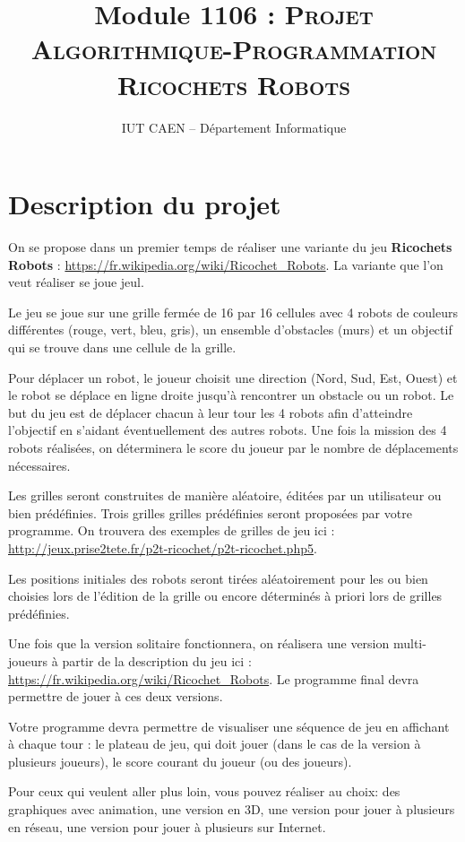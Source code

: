 \documentclass[10pt]{article}
\title{Module 1106 : \textsc{Projet Algorithmique-Programmation \\ Ricochets Robots}}
\author{IUT CAEN -- Département Informatique}
\begin{document}
\maketitle

\pagestyle{empty}

\section{Description du projet}

On se propose dans un premier temps de réaliser une variante du jeu {\bf Ricochets Robots} : \url{https://fr.wikipedia.org/wiki/Ricochet_Robots}. La variante que l'on veut réaliser se joue jeul.

Le jeu se joue sur une grille fermée de 16 par 16 cellules avec 4 robots de couleurs différentes (rouge, vert,
bleu, gris), un ensemble d'obstacles (murs) et un objectif qui se trouve dans une cellule de la grille.

Pour déplacer un robot, le joueur choisit une direction (Nord, Sud, Est, Ouest) et le robot
se déplace en ligne droite jusqu'à rencontrer un obstacle ou un robot. Le but du jeu
est de déplacer chacun à leur tour les 4 robots afin d'atteindre l'objectif en s'aidant éventuellement des autres robots. Une fois la mission des 4 robots réalisées, on déterminera le score du joueur par le nombre de déplacements nécessaires.

Les grilles seront construites de manière aléatoire, éditées par un utilisateur ou bien prédéfinies. 
Trois grilles grilles prédéfinies seront proposées par votre programme. On trouvera des exemples de grilles de jeu ici :
\url{http://jeux.prise2tete.fr/p2t-ricochet/p2t-ricochet.php5}.

Les positions initiales des robots seront tirées aléatoirement pour les ou bien choisies lors de l'édition de la grille ou encore déterminés à priori lors de grilles prédéfinies.

 Une fois que la version solitaire fonctionnera, on réalisera une version multi-joueurs à partir de la description du jeu ici :
\url{https://fr.wikipedia.org/wiki/Ricochet_Robots}. Le programme final devra permettre de jouer à ces deux versions.

Votre programme devra permettre de visualiser une séquence de jeu en affichant à chaque tour : le plateau de jeu, qui doit jouer (dans le cas de la version à plusieurs joueurs), le score courant du joueur (ou des joueurs).

Pour ceux qui veulent aller plus loin, vous pouvez réaliser au choix: des graphiques avec animation, une version en 3D, une version pour jouer à plusieurs en réseau, une version pour jouer à plusieurs sur Internet.
\end{document}
